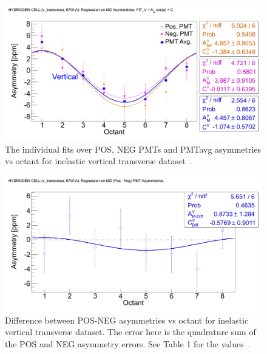 \begin{singlespace}
\begin{figure}[!h]
	\begin{center}
	\includegraphics[width=15.0cm]{figures/MD_v_transverse_LH2_PMTAsymmetries_off_on}
	\end{center}
	\caption
	{The individual fits over POS, NEG PMTs and PMTavg asymmetries vs octant for inelastic vertical transverse dataset~\cite{elog:nur_ancillary145}.}
	\label{fig:MD_v_transverse_LH2_PMTAsymmetries_off_on}
\end{figure}
\end{singlespace}

\begin{singlespace}
\begin{figure}[!h]
	\begin{center}
	\includegraphics[width=15.0cm]{figures/MD_v_transverse_LH2_PMTAsymmetriesDiff_off_on}
	\end{center}
	\caption
	{Difference between POS-NEG asymmetries vs octant for inelastic vertical transverse dataset. The error here is the quadrature sum of the POS and NEG asymmetry errors. See Table 1 for the values~\cite{elog:nur_ancillary145}.}
	\label{fig:MD_v_transverse_LH2_PMTAsymmetriesDiff_off_on}
\end{figure}
\end{singlespace}



